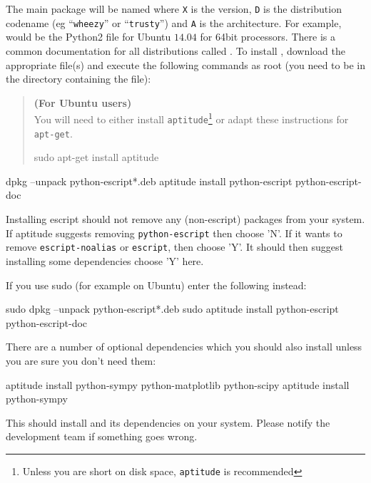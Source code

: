 The main package will be named  where \texttt{X} is the version, \texttt{D} 
is the distribution codename (eg ``\texttt{wheezy}'' or ``\texttt{trusty}'') and \texttt{A} is the architecture.
For example,  would be the Python2 file for Ubuntu $14.04$ for 64bit processors.
There is a common documentation for all distributions called .
To install \esfinley, download the appropriate  file(s) and execute the following 
commands as root (you need to be in the directory containing the file):

\begin{verse}
\textbf{(For Ubuntu users)}\\
You will need to either install \texttt{aptitude}\footnote{Unless you are short on disk space, \texttt{aptitude} 
is recommended} or adapt these instructions for \texttt{apt-get}.
\begin{shellCode}
sudo apt-get install aptitude
\end{shellCode}
\end{verse}

\begin{shellCode}
dpkg --unpack python-escript*.deb
aptitude install python-escript python-escript-doc
\end{shellCode}

Installing escript should not remove any (non-escript) packages from your system.
If aptitude suggests removing \texttt{python-escript} then choose 'N'.
If it wants to remove \texttt{escript-noalias} or \texttt{escript}, then choose 'Y'.
It should then suggest installing some dependencies choose 'Y' here.

If you use sudo (for example on Ubuntu) enter the following instead:
\begin{shellCode}
sudo dpkg --unpack python-escript*.deb
sudo aptitude install python-escript python-escript-doc
\end{shellCode}

There are a number of optional dependencies which you should also install unless you are sure you don't need them:
\begin{shellCode}
aptitude install python-sympy python-matplotlib python-scipy 
aptitude install python-sympy
\end{shellCode}



This should install \esfinley and its dependencies on your system.
Please notify the development team if something goes wrong.

